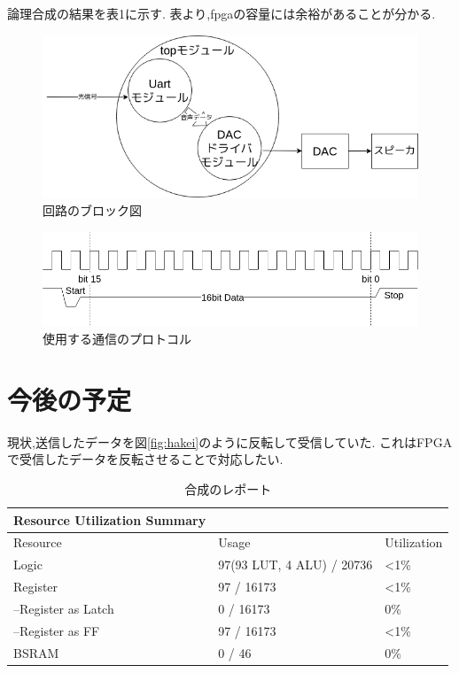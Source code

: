 \documentclass[a4paper,10pt]{article}
\begin{document}
\begin{multicols}{2}
論理合成の結果を表1に示す.
表より,fpgaの容量には余裕があることが分かる.


\begin{figure}[H] %
  \centering
  \includegraphics[width=\linewidth]{system.drawio.png}
  \caption{回路のブロック図}
  \label{fig:system}
\end{figure}

\begin{figure}[H] %
  \centering
  \includegraphics[width=\linewidth]{uart.drawio.png}
  \caption{使用する通信のプロトコル}
  \label{fig:uart}
\end{figure}

\section{今後の予定}
現状,送信したデータを図\ref{fig:hakei}のように反転して受信していた.
これはFPGAで受信したデータを反転させることで対応したい.
\end{multicols}

\begin{table}[H]
\centering
\caption{合成のレポート}
\label{tab:gouesi}
\begin{tabular}{lll}
  \hline
  Resource Utilization Summary &                           &                \\
  \hline
Resource                     & Usage                     & Utilization    \\
Logic                        & 97(93 LUT, 4 ALU) / 20736 & \textless{}1\% \\
Register                     & 97 / 16173                & \textless{}1\% \\
--Register as Latch          & 0 / 16173                 & 0\%            \\
--Register as FF             & 97 / 16173                & \textless{}1\% \\
  BSRAM                        & 0 / 46                    & 0\%          \\
  \hline
\end{tabular}
\end{table}
\end{document}
